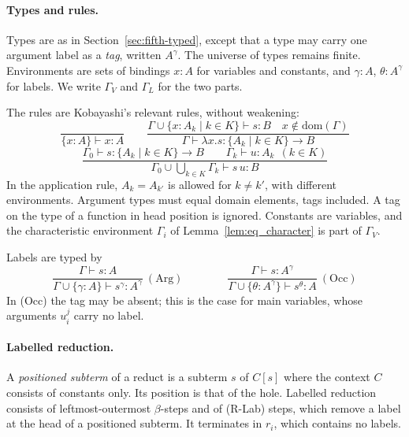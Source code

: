\documentclass[10pt,a4paper]{article}
\theoremstyle{plain}%
\begin{document}
\paragraph{Types and rules.}
Types are as in Section~\ref{sec:fifth-typed}, except that a type may carry one argument label as a \emph{tag}, written $A^\gamma$.
The universe of types remains finite.
Environments are sets of bindings $x : A$ for variables and constants, and $\gamma : A$, $\theta : A^\gamma$ for labels.
We write $\Gamma_V$ and $\Gamma_L$ for the two parts.

The rules are Kobayashi's relevant rules, without weakening:
\[
\frac{}{\{x : A\} \vdash x : A}
\qquad
\frac{\Gamma \cup \{x : A_k \mid k \in K\} \vdash s : B \quad x \notin \mathrm{dom}(\Gamma)}{\Gamma \vdash \lambda x.s : \{A_k \mid k \in K\} \to B}
\]
\[
\frac{\Gamma_0 \vdash s : \{A_k \mid k \in K\} \to B \qquad \Gamma_k \vdash u : A_k \ \ (k \in K)}{\Gamma_0 \cup \bigcup_{k \in K} \Gamma_k \vdash s\,u : B}
\]
In the application rule, $A_k = A_{k'}$ is allowed for $k \neq k'$, with different environments.
Argument types must equal domain elements, tags included.
A tag on the type of a function in head position is ignored.
Constants are variables, and the characteristic environment $\Gamma_i$ of Lemma~\ref{lem:eq_character} is part of $\Gamma_V$.

Labels are typed by
\[
\frac{\Gamma \vdash s : A}{\Gamma \cup \{\gamma : A\} \vdash s^\gamma : A^\gamma}\ (\mathrm{Arg})
\qquad\qquad
\frac{\Gamma \vdash s : A^\gamma}{\Gamma \cup \{\theta : A^\gamma\} \vdash s^\theta : A}\ (\mathrm{Occ})
\]
In (Occ) the tag may be absent; this is the case for main variables, whose arguments $u_i^j$ carry no label.

\paragraph{Labelled reduction.}
A \emph{positioned subterm} of a reduct is a subterm $s$ of $C[s]$ where the context $C$ consists of constants only.
Its position is that of the hole.
Labelled reduction consists of leftmost-outermost $\beta$-steps and of (R-Lab) steps, which remove a label at the head of a positioned subterm.
It terminates in $r_i$, which contains no labels.
\end{document}
